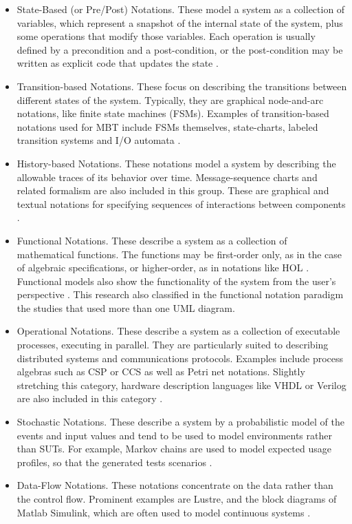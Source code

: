 \documentclass[espaco=umemeio,chapter=TITLE,twoside,openright]{abnt}
\begin{document}
\begin{itemize}
\item State-Based (or Pre/Post) Notations. These model a system as a collection of variables, which represent a snapshot of the internal state of the system, plus some operations that modify those variables. Each operation is usually defined by a precondition and a post-condition, or the post-condition may be written as explicit code that updates the state \cite{MarkUtting2012}.
\item Transition-based Notations. These focus on describing the transitions between different states
of the system. Typically, they are graphical node-and-arc notations, like finite state machines
(FSMs). Examples of transition-based notations used for MBT include FSMs themselves, state-charts, labeled transition systems and I/O automata \cite{MarkUtting2012}.
\item History-based Notations. These notations model a system by describing the allowable traces
of its behavior over time. Message-sequence charts and related formalism are also included in this group. These are
graphical and textual notations for specifying sequences of interactions between components \cite{MarkUtting2012}.
\item Functional Notations. These describe a system as a collection of mathematical functions. The
functions may be first-order only, as in the case of algebraic specifications, or higher-order, as in
notations like HOL \cite{MarkUtting2012}. Functional models also show the functionality of the system from the user’s perspective \cite{Ye2007}. This research also classified in the functional notation paradigm the studies that used more than one UML diagram. 
\item Operational Notations. These describe a system as a collection of executable processes,
executing in parallel. They are particularly suited to describing distributed systems and
communications protocols. Examples include process algebras such as CSP or CCS as well as
Petri net notations. Slightly stretching this category, hardware description languages like VHDL
or Verilog are also included in this category \cite{MarkUtting2012}.
\item Stochastic Notations. These describe a system by a probabilistic model of the events and input
values and tend to be used to model environments rather than SUTs. For example, Markov chains
are used to model expected usage profiles, so that the generated tests scenarios \cite{MarkUtting2012}.
\item Data-Flow Notations. These notations concentrate on the data rather than the control flow.
Prominent examples are Lustre, and the block diagrams of Matlab Simulink, which are often used
to model continuous systems \cite{MarkUtting2012}.
\end{itemize}
\end{document}
